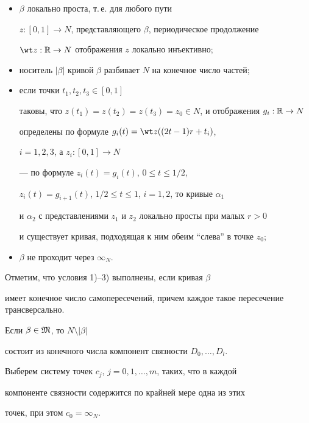 \begin{itemize}


\item[1)] $\beta$ локально проста, т.\,е. для любого пути


$z:[0,1]\to N$, представляющего $\beta$, периодическое продолжение


$\wt z:\Bbb R\to N$ отображения $z$ локально инъективно;


\item[2)] носитель $|\beta|$ кривой $\beta $ разбивает $N$ на конечное число частей;


\item[3)] если точки $t_1,t_2,t_3\in[0,1]$


таковы, что $z(t_1)=z(t_2)=z(t_3)=z_0\in N$, и отображения $g_i:\Bbb R\to N$


определены по формуле $g_i(t)=\wt z((2t-1)r+t_i)$,


$i=1,2,3$, а $z_i:[0,1]\to N$


--- по формуле $z_i(t)=g_i(t)$, $0\le t\le 1/2$,


$z_i(t)=g_{i+1}(t)$, $1/2\le t\le 1$, $i=1,2$, то кривые $\alpha_1$


и $\alpha_2$ с представлениями $z_1$ и $z_2$ локально просты при малых $r>0$


и существует кривая, подходящая к ним обеим ``слева'' в точке $z_0$;


\item[4)] $\beta$ не проходит через $\infty_N$.


\end{itemize}





Отметим, что условия 1)--3) выполнены, если кривая $\beta$


имеет конечное число самопересечений, причем каждое такое пересечение трансверсально.





Если $\beta\in\frak M$, то $N\setminus |\beta|$


состоит из конечного числа компонент связности $D_0,\dotsc,D_l$.


Выберем систему точек $c_j$, $j=0,1,\dotsc,m$, таких, что в каждой


компоненте связности содержится по крайней мере одна из этих


точек, при этом $c_0=\infty_N$.





